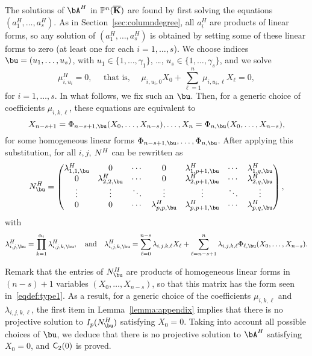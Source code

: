 \documentclass[12pt]{article}
\begin{document}
The solutions of $\bA^H$ in $\mathbb{P}^n(\overline{\mathbf{K}})$ are found by first solving
the equations $(a^H_1,\dots,a^H_s)$. As in Section~\ref{sec:columndegree}, all
$a_i^H$ are products of linear forms, so any solution of
$(a^H_1,\dots,a^H_s)$ is obtained by setting some of these linear forms
to zero (at least one for each $i=1,\dots,s$). We choose indices $\bu=(u_1,\dots,u_s)$, with
$u_1\in\{1,\dots,\gamma_1\}$, \dots, $u_s\in\{1,\dots,\gamma_s\}$, and
we solve
$$\mu^H_{i,u_i}=0, \quad \text{~that is,~} \quad \mu_{i,u_i,0}X_0 + \sum_{\ell = 1}^{n}\mu_{i,u_i,\ell}X_\ell =0,$$ for $i=1,\dots,s$.
In what follows, we fix such an $\bu$.
Then, for a generic choice of coefficients $\mu_{i,k,\ell}$, these equations
are equivalent to
$$X_{n-s+1}=\Phi_{n-s+1,\bu}(X_0,\dots,X_{n-s}),\dots,X_{n}=\Phi_{n,\bu}(X_0,\dots,X_{n-s}),$$
for some homogeneous linear forms $\Phi_{n-s+1,\bu},\dots,\Phi_{n,\bu}$.
After applying this substitution, for all $i,j$,
${N}^H$ can be rewritten as 
\begin{align*}
 \mN^H_\bu = \left( \begin{matrix}
\lambda^H_{1,1,\bu} & 0 & \cdots & 0 & \lambda^H_{1,p+1,\bu} & \cdots & \lambda^H_{1, q,\bu}\\
0 & \lambda^H_{2,2,\bu} & \cdots & 0 & \lambda^H_{2,p+1,\bu} & \cdots & \lambda^H_{2, q,\bu}\\
\vdots & \vdots & \ddots & \vdots & \vdots & \ddots & \vdots\\
0 & 0 & \cdots & \lambda^H_{p,p,\bu} & \lambda^H_{p,p+1,\bu} & \cdots & \lambda^H_{p, q,\bu}
\end{matrix} \right),
\end{align*}
with
$$\lambda^H_{i,j,\bu}=\prod_{k=1}^{\alpha_i}\lambda^H_{i,j,k,\bu},
\quad\text{and}\quad \lambda^H_{i,j,k,\bu}=\sum_{\ell =
  0}^{n-s}\lambda_{i,j,k,\ell}X_\ell + \sum_{\ell =
  n-s+1}^{n}\lambda_{i,j,k,\ell}
\Phi_{\ell,\bu}(X_0,\dots,X_{n-s}).$$ 

Remark that the entries of $\mN^H_\bu$ are products of homogeneous
linear forms in $(n-s)+1$ variables $(X_0,\dots,X_{n-s})$, so that
this matrix has the form seen in~\eqref{eqdef:type1}. As a result, for
a generic choice of the coefficients $\mu_{i,k,\ell}$ and
$\lambda_{i,j,k,\ell}$, the first item in Lemma~\ref{lemma:appendix}
implies that there is no projective solution to $I_p(\mN^H_\bu)$
satisfying $X_0=0$. Taking into account all possible choices of $\bu$,
we deduce that there is no projective solution to $\bA^H$ satisfying
$X_0=0$, and  $\mathsf{C}_2(0)$ is proved.
\end{document}

